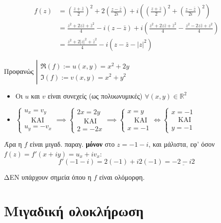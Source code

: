 \documentclass[12pt,a4paper,notitlepage,fleqn]{article}
\begin{document}
\begin{enumroman}
		\begin{align*}
			f(z) &= \left(\frac{z+\bar z}{2}\right)^2+2\left(\frac{z-\bar z}{2i}\right)
			+i\left(\left(\frac{z+\bar z}{2}\right)^2+\left(\frac{z-\bar z}{2i}\right)^2\right)
			\\ &= \frac{z^2+2z\bar z+\bar z^2}{4}-
			i\left(z-\bar z\right)+i\left(\frac{z^2+2z\bar z+\bar z^2}{4}
			-\frac{z^2-2z\bar z+z^2}{4}\right)
			\\ &= \frac{z^2+2|z|^2+\bar z^2}{4}-i\left(
			z-\bar z-|z|^2
			\right)
		\end{align*}
		\item Προφανώς
		\(
		\left|
		\begin{array}{l}
		\Re(f) := u(x,y) = x^2+2y \\
		\Im(f) := v(x,y) = x^2+y^2
		\end{array}
		 \right.
		 \)
		 \begin{itemize}
		 	\item Οι \( u \) και \( v \) είναι συνεχείς (ως πολυωνυμικές) \( \forall
		 	(x,y)\in\mathbb R^2
		 	 \)
		 	\item
		 	\(
		 	\begin{cases}
		 	u_x=v_y \\ \quad\text{ΚΑΙ} \\ u_y=-v_x
		 	\end{cases} \implies \begin{cases}
		 	2x=2y\\ \quad\text{ΚΑΙ} \\ 2=-2x
		 	\end{cases} \implies \begin{cases}
		 	x=y \\ \quad \text{ΚΑΙ} \\ x = -1
		 	\end{cases} \iff \begin{cases}
		 	x=-1 \\ \quad\text{ΚΑΙ} \\ y=-1
		 	\end{cases}
		 	 \)
		 \end{itemize}
		 Άρα η \( f \) είναι μιγαδ. παραγ. \textbf{μόνον} στο \( \boxed{z=-1-i} \),
		 και μάλιστα, εφ' όσον \( f(z)=f'(x+iy)=u_x+iv_x \):
		 \[
		 f'(-1-i) = 2(-1)+i2(-1) = \underline{-2-i2}
		 \]
		 \item ΔΕΝ υπάρχουν σημεία όπου η \( f \) είναι ολόμορφη.
	\end{enumroman}

	\section{Μιγαδική ολοκλήρωση}
\end{document}
